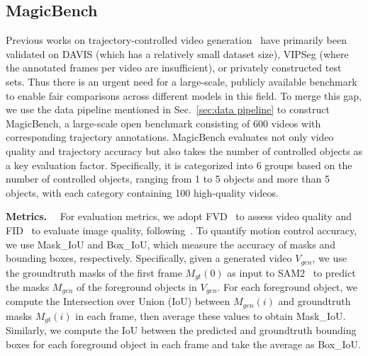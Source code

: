 \subsection{MagicBench}
\label{sec:benchmark}
Previous works on trajectory-controlled video generation~\cite{zhang2025tora, li2025image, shi2024motion, objctrl2.5d, zhou2025trackgo, wu2024draganything, namekata2024sgi2v} have primarily been validated on DAVIS (which has a relatively small dataset size), VIPSeg (where the annotated frames per video are insufficient), or privately constructed test sets. Thus there is an urgent need for a large-scale, publicly available benchmark to enable fair comparisons across different models in this field.
To merge this gap, we use the data pipeline mentioned in Sec.~\ref{sec:data pipeline} to construct MagicBench, a large-scale open benchmark consisting of 600 videos with corresponding trajectory annotations. MagicBench evaluates not only video quality and trajectory accuracy but also takes the number of controlled objects as a key evaluation factor. Specifically, it is categorized into 6 groups based on the number of controlled objects, ranging from 1 to 5 objects and more than 5 objects, with each category containing 100 high-quality videos.

\vspace{0.2cm}
\noindent\textbf{Metrics.}
~~For evaluation metrics, we adopt FVD~\cite{ranftl2020towards} to assess video quality and FID~\cite{heusel2017gans} to evaluate image quality, following~\cite{zhou2025trackgo, wang2024motionctrl, wang2025levitor, wu2024draganything}. To quantify motion control accuracy, we use Mask\_IoU and Box\_IoU, which measure the accuracy of masks and bounding boxes, respectively.
Specifically, given a generated video $V_{gen}$, we use the groundtruth masks of the first frame $M_{gt}(0)$ as input to SAM2~\cite{ravi2024sam} to predict the masks $M_{gen}$ of the foreground objects in $V_{gen}$. For each foreground object, we compute the Intersection over Union (IoU) between $M_{gen}(i)$ and groundtruth masks $M_{gt}(i)$ in each frame, then average these values to obtain Mask\_IoU. Similarly, we compute the IoU between the predicted and groundtruth bounding boxes for each foreground object in each frame and take the average as Box\_IoU.
